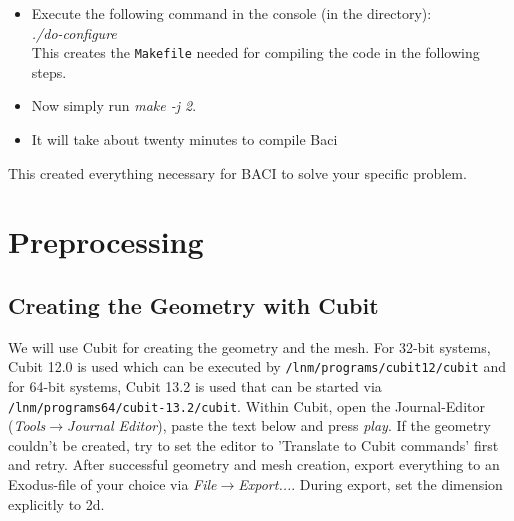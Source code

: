 \begin{itemize}
\item Execute the following command in the console (in the \baci{} directory):\\
\emph{./do-configure}\\
This creates the \texttt{Makefile} needed for compiling the code
in the following steps. 
\item Now simply run \emph{make -j 2}.
\item It will take about twenty minutes to compile Baci
\end{itemize}
This created everything necessary for BACI to solve your specific
problem.


\section{Preprocessing}

\subsection{Creating the Geometry with Cubit}
We will use Cubit for creating the geometry and the mesh. For 32-bit systems, Cubit 12.0 is used which can be executed by \texttt{/lnm/programs/cubit12/cubit} and for 64-bit systems, Cubit 13.2 is used that can be started via \texttt{/lnm/programs64/cubit-13.2/cubit}. Within Cubit, open the Journal-Editor (\emph{Tools}$\to$\emph{Journal
Editor}), paste the text below and press \emph{play}. If the geometry couldn't be created, try to set the editor to 'Translate to Cubit commands' first and retry. After successful geometry and mesh creation, export everything to an Exodus-file of your choice via \emph{File}$\to$\emph{Export...}. During export, set the dimension explicitly to 2d.

